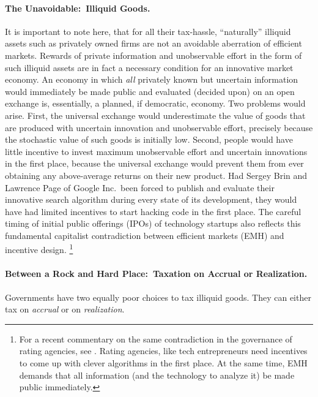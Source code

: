 \paragraph{The Unavoidable:~Illiquid Goods.}
It is important to note here, that for all their tax-hassle, ``naturally'' illiquid assets such as privately owned firms are not an avoidable aberration of efficient markets.
Rewards of private information and unobservable effort in the form of such illiquid assets are in fact a necessary condition for an innovative market economy.
An economy in which \emph{all} privately known but uncertain information would immediately be made public and evaluated (decided upon) on an open exchange is, essentially, a planned, if democratic, economy.
 Two problems would arise.
First, the universal exchange would underestimate the value of goods that are produced with uncertain innovation and unobservable effort, precisely because the stochastic value of such goods is initially low.
Second, people would have little incentive to invest maximum unobservable effort and uncertain innovations in the first place, because the universal exchange would prevent them from ever obtaining any above-average returns on their new product.
Had Sergey Brin and Lawrence Page of Google Inc.\ been forced to publish and evaluate their innovative search algorithm during every state of its development, they would have had limited incentives to start hacking code in the first place.
The careful timing of initial public offerings (IPOs) of technology startups also reflects this fundamental capitalist contradiction between efficient markets (EMH) and incentive design.
\footnote{
	For a recent commentary on the same contradiction in the governance of rating agencies, see \citealt{TheEconomist2009}.
	Rating agencies, like tech entrepreneurs need incentives to come up with clever algorithms in the first place.
	At the same time, EMH demands that all information (and the technology to analyze it) be made public immediately.
}

\paragraph{Between a Rock and Hard Place:~Taxation on Accrual or Realization.}
Governments have two equally poor choices to tax illiquid goods.
They can either tax on \emph{accrual} or on \emph{realization}.

